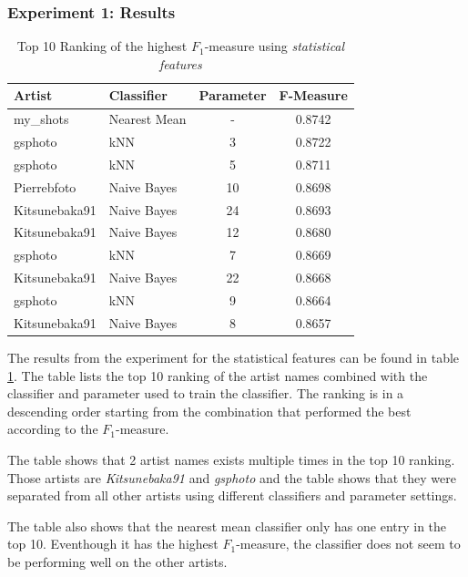 \subsubsection{Experiment 1: Results}

\begin{table}
    \centering
    \begin{tabular}
        { | l | l | c | c } 
        \hline
        Artist & Classifier & Parameter & F-Measure \\
        \hline
        my\_shots & Nearest Mean & - & 0.8742 \\ 
        gsphoto & kNN & 3 & 0.8722 \\ 
        gsphoto & kNN & 5 & 0.8711 \\ 
        Pierrebfoto & Naive Bayes & 10 & 0.8698 \\ 
        Kitsunebaka91 & Naive Bayes & 24 & 0.8693 \\
        Kitsunebaka91 & Naive Bayes & 12 & 0.8680 \\
        gsphoto & kNN & 7 & 0.8669 \\
        Kitsunebaka91 & Naive Bayes & 22 & 0.8668 \\
        gsphoto & kNN & 9 & 0.8664 \\
        Kitsunebaka91 & Naive Bayes & 8 & 0.8657 \\
        \hline 
    \end{tabular}
    \caption{Top 10 Ranking of the highest $F_1$-measure using \textit{statistical features}}
    \label{ex1aresults}
\end{table}

The results from the experiment for the statistical features can be found in table \ref{ex1aresults}.
The table lists the top 10 ranking of the artist names combined with the classifier and parameter used to train the classifier.
The ranking is in a descending order starting from the combination that performed the best according to the $F_1$-measure.

The table shows that 2 artist names exists multiple times in the top 10 ranking.
Those artists are \textit{Kitsunebaka91} and \textit{gsphoto} and the table shows that they were separated from all other artists using different classifiers and parameter settings.

The table also shows that the nearest mean classifier only has one entry in the top 10.
Eventhough it has the highest $F_1$-measure, the classifier does not seem to be performing well on the other artists.

